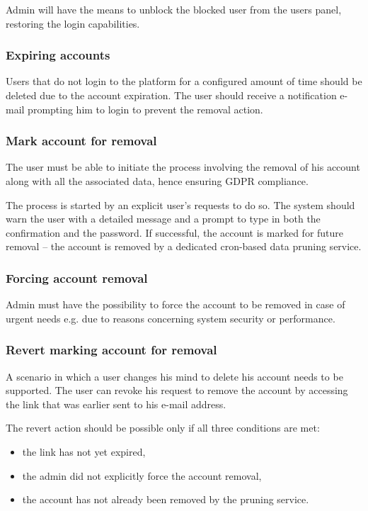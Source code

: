 \documentclass[a4paper,twoside,12pt]{book}
\begin{document}
Admin will have the means to unblock the blocked user from the users panel, restoring the login capabilities.

\subsubsection{Expiring accounts}

Users that do not login to the platform for a configured amount of time should be deleted due to the account expiration. The user should receive a notification e-mail prompting him to login to prevent the removal action.

\subsubsection{Mark account for removal}

The user must be able to initiate the process involving the removal of his account along with all the associated data, hence ensuring GDPR compliance.

The process is started by an explicit user's requests to do so. The system should warn the user with a detailed message and a prompt to type in both the confirmation and the password. If successful, the account is marked for future removal -- the account is removed by a dedicated cron-based data pruning service.

\subsubsection{Forcing account removal}

Admin must have the possibility to force the account to be removed in case of urgent needs e.g. due to reasons concerning system security or performance.

\subsubsection{Revert marking account for removal}

A scenario in which a user changes his mind to delete his account needs to be supported. The user can revoke his request to remove the account by accessing the link that was earlier sent to his e-mail address.

The revert action should be possible only if all three conditions are met:
\begin{itemize}
\item the link has not yet expired,
\item the admin did not explicitly force the account removal,
\item the account has not already been removed by the pruning service.
\end{itemize}
\end{document}
